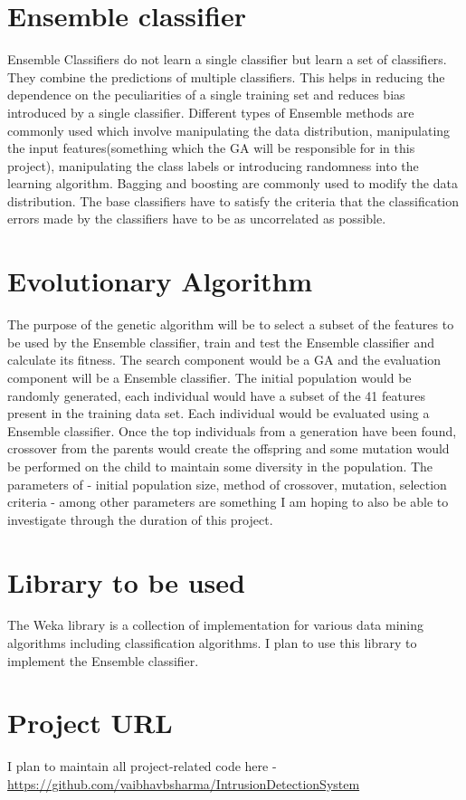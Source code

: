 \documentclass{article}
\begin{document}
\section{Ensemble classifier}
Ensemble Classifiers do not learn a single classifier but learn a set of classifiers. They combine the predictions of multiple classifiers. This helps in reducing the dependence on the peculiarities of a single training set and reduces bias introduced by a single classifier. Different types of Ensemble methods are commonly used which involve manipulating the data distribution, manipulating the input features(something which the GA will be responsible for in this project), manipulating the class labels or introducing randomness into the learning algorithm. Bagging and boosting are commonly used to modify the data distribution. The base classifiers have to satisfy the criteria that the classification errors made by the classifiers have to be as uncorrelated as possible.  

\section{Evolutionary Algorithm}
The purpose of the genetic algorithm will be to select a subset of the features to be used by the Ensemble classifier, train and test the Ensemble classifier and calculate its fitness. The search component would be a GA and the evaluation component will be a Ensemble classifier. The initial population would be randomly generated, each individual would have a subset of the 41 features present in the training data set. Each individual would be evaluated using a Ensemble classifier. Once the top individuals from a generation have been found, crossover from the parents would create the offspring and some mutation would be performed on the child to maintain some diversity in the population. The parameters of - initial population size, method of crossover, mutation, selection criteria - among other parameters are something I am hoping to also be able to investigate through the duration of this project. 

\section{Library to be used}
The Weka library\cite{weka} is a collection of implementation for various data mining algorithms including classification algorithms. I plan to use this library to implement the Ensemble classifier.

\section{Project URL}
I plan to maintain all project-related code here -
\url{https://github.com/vaibhavbsharma/IntrusionDetectionSystem}



\end{document}
